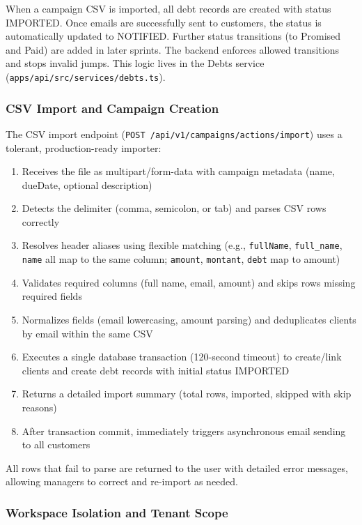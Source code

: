 \documentclass[12pt,a4paper]{report}
\begin{document}
When a campaign CSV is imported, all debt records are created with status IMPORTED.
Once emails are successfully sent to customers, the status is automatically updated
to NOTIFIED.
Further status transitions (to Promised and Paid) are added in later sprints.
The backend enforces allowed transitions and stops invalid jumps.
This logic lives in the Debts service (\texttt{apps/api/src/services/debts.ts}).

\subsubsection{CSV Import and Campaign Creation}

The CSV import endpoint (\texttt{POST /api/v1/campaigns/actions/import}) uses a
tolerant, production-ready importer:

\begin{enumerate}
  \item Receives the file as multipart/form-data with campaign metadata (name, dueDate, optional description)
  \item Detects the delimiter (comma, semicolon, or tab) and parses CSV rows correctly
  \item Resolves header aliases using flexible matching (e.g., \texttt{fullName}, \texttt{full\_name}, \texttt{name} all map to the same column; \texttt{amount}, \texttt{montant}, \texttt{debt} map to amount)
  \item Validates required columns (full name, email, amount) and skips rows missing required fields
  \item Normalizes fields (email lowercasing, amount parsing) and deduplicates clients by email within the same CSV
  \item Executes a single database transaction (120-second timeout) to create/link clients and create debt records with initial status IMPORTED
  \item Returns a detailed import summary (total rows, imported, skipped with skip reasons)
  \item After transaction commit, immediately triggers asynchronous email sending to all customers
\end{enumerate}

All rows that fail to parse are returned to the user with detailed error messages, allowing managers to correct and re-import as needed.

\subsubsection{Workspace Isolation and Tenant Scope}
\end{document}
